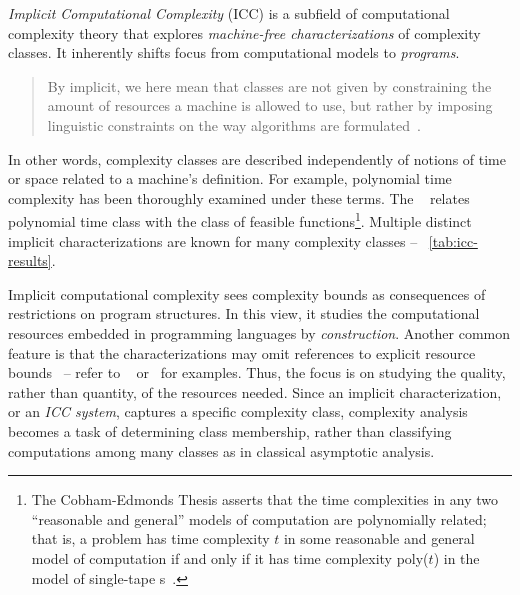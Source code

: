 \emph{Implicit Computational Complexity} (ICC) is a subfield of computational complexity theory that explores \emph{machine-free characterizations} of complexity classes.
It inherently shifts focus from computational models to \emph{programs}.
\begin{quotation}
    \noindent By implicit, we here mean that classes are not given by constraining the amount of resources a machine is allowed to use, but rather by imposing linguistic constraints on the way algorithms are formulated~\cite[p. 90]{dallago2011}.
\end{quotation}
In other words, complexity classes are described independently of notions of time or space related to a machine's definition.
For example, polynomial time complexity has been thoroughly examined under these terms.
The ~\cite{cobham1965,edmonds1965} relates polynomial time class with the class of feasible functions\footnote{
    The Cobham-Edmonds Thesis asserts that the time complexities in any two \enquote{reasonable and general} models of computation are polynomially related;
    that is, a problem has time complexity \(t\) in some reasonable and general model of computation
    if and only if it has time complexity poly(\(t\)) in the model of single-tape s~\cite[p. 33]{goldreich2008}.}.
Multiple distinct implicit characterizations are known for many complexity classes -- \cf~\autoref{tab:icc-results}.

Implicit computational complexity sees complexity bounds as consequences of restrictions on program structures.
In this view, it studies the computational resources embedded in programming languages by \emph{construction}.
Another common feature is that the characterizations may omit references to explicit resource bounds~\cite{moyen2017} -- refer to \eg~%
\textcite{bellantoni1992} or~\textcite{kristiansen2005} for examples.
Thus, the focus is on studying the quality, rather than quantity, of the resources needed.
Since an implicit characterization, or an \emph{ICC system}, captures a specific complexity class, complexity analysis becomes a task of determining class membership, rather than classifying computations among many classes as in classical asymptotic analysis.

